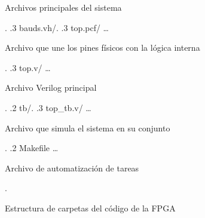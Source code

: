 \begin{figure}[hbtp]
\begin{minipage}{11cm}
{\begin{minipage}[t]{7cm}
\begin{flushright}
                                Archivos principales del sistema
                            \end{flushright}
                        \end{minipage}.
            .3 bauds.vh/.
            .3 top.pcf/     \ldots{}
                            \begin{minipage}[t]{6.6cm}
                                \begin{flushright}
                                    Archivo que une los pines físicos con la lógica interna
                                \end{flushright}
                            \end{minipage}.
            .3 top.v/       \ldots{}
                            \begin{minipage}[t]{7cm}
                                \begin{flushright}
                                    Archivo Verilog principal
                                \end{flushright}
                            \end{minipage}.
            .2 tb/.
            .3 top\_tb.v/       \ldots{}
                                \begin{minipage}[t]{6.5cm}
                                    \begin{flushright}
                                        Archivo que simula el sistema en su conjunto
                                    \end{flushright}
                                \end{minipage}.
            .2 Makefile     \ldots{}
                            \begin{minipage}[t]{7cm}
                                \begin{flushright}
                                    Archivo de automatización de tareas
                                \end{flushright}
                            \end{minipage}.
        }
    \end{minipage}
    \caption{Estructura de carpetas del código de la FPGA}
    \label{fig:tree-fpga}
\end{figure}





